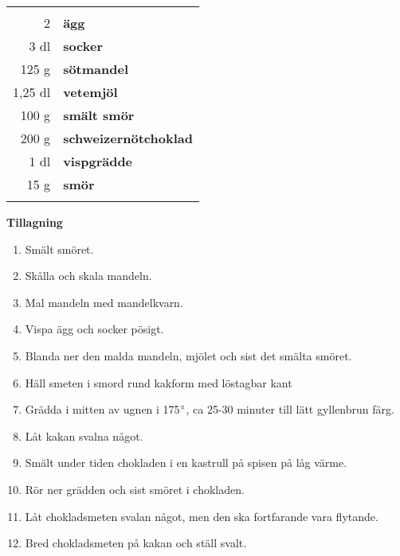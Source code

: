 \begin{table}[H]
	\begin{tabular}{rl}
	\hline
	&\\
		2 & \textbf{ägg}\\
		3 dl & \textbf{socker}\\
		125 g & \textbf{sötmandel}\\
		1,25 dl & \textbf{vetemjöl}\\
		100 g & \textbf{smält smör}\\
		200 g & \textbf{schweizernötchoklad}\\
		1 dl & \textbf{vispgrädde}\\
		15 g& \textbf{smör}\\
	&\\
	\hline
	\end{tabular}
\end{table}


\begin{multicols*}{2}

\noindent \textbf{Tillagning}
\begin{enumerate}
	\itemsep0cm
	\item Smält smöret.
	\item Skålla och skala mandeln.
	\item Mal mandeln med mandelkvarn.
	\item Vispa ägg och socker pösigt.
	\item Blanda ner den malda mandeln, mjölet och sist det smälta smöret.
	\item Häll smeten i smord rund kakform med löstagbar kant
	\item Grädda i mitten av ugnen i 175$\degree$, ca 25-30 \mbox{minuter} till lätt gyllenbrun färg.
	\item Låt kakan svalna något.
	\item Smält under tiden chokladen i en kastrull på spisen på låg värme.
	\item Rör ner grädden och sist smöret i chokladen.
	\item Låt chokladsmeten svalan något, men den ska fortfarande vara flytande.
	\item Bred chokladsmeten på kakan och ställ svalt.
\end{enumerate}

\end{multicols*}

\clearpage